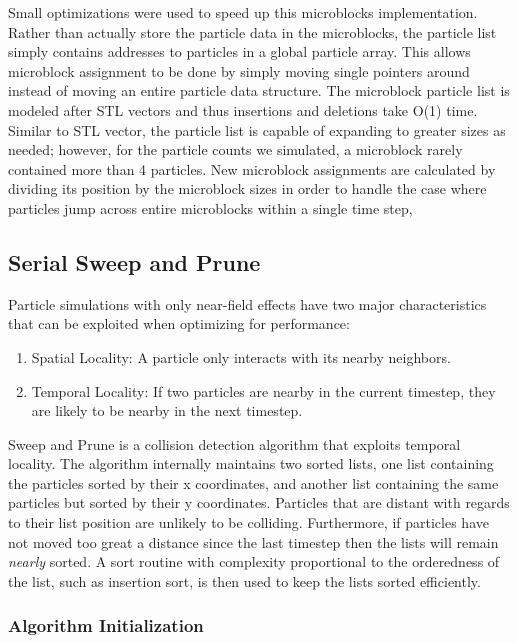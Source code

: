\documentclass[11pt]{article} %
\begin{document}
Small optimizations were used to speed up this microblocks implementation. Rather than actually store the particle data in the microblocks, the particle list simply contains addresses to particles in a global particle array. This allows microblock assignment to be done by simply moving single pointers around instead of moving an entire particle data structure. The microblock particle list is modeled after STL vectors and thus insertions and deletions take O(1) time. Similar to STL vector, the particle list is capable of expanding to greater sizes as needed; however, for the particle counts we simulated, a microblock rarely contained more than 4 particles. New microblock assignments are calculated by dividing its position by the microblock sizes in order to handle the case where particles jump across entire microblocks within a single time step,

\subsection{Serial Sweep and Prune}

Particle simulations with only near-field effects have two major characteristics
that can be exploited when optimizing for performance:
\begin{enumerate}
\item Spatial Locality: A particle only interacts with its nearby neighbors.
\item Temporal Locality: If two particles are nearby in the current timestep,
they are likely to be nearby in the next timestep.
\end{enumerate}
Sweep and Prune is a collision detection algorithm that exploits temporal
locality. The algorithm internally maintains two sorted lists, one
list containing the particles sorted by their x coordinates, and another
list containing the same particles but sorted by their y coordinates.
Particles that are distant with regards to their list position are
unlikely to be colliding. Furthermore, if particles have not moved
too great a distance since the last timestep then the lists will remain
\emph{nearly} sorted. A sort routine with complexity proportional
to the orderedness of the list, such as insertion sort, is then used
to keep the lists sorted efficiently. 

\subsubsection{Algorithm Initialization}
\end{document}
